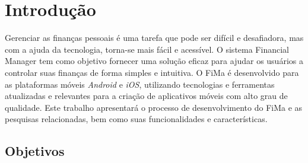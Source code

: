 % 

\chapter[Introdução]{Introdução}

Gerenciar as finanças pessoais é uma tarefa que pode ser difícil e desafiadora, mas com a ajuda da tecnologia, torna-se mais fácil e acessível. O sistema Financial Manager tem como objetivo fornecer uma solução eficaz para ajudar os usuários a controlar suas finanças de forma simples e intuitiva. O FiMa é desenvolvido para as plataformas móveis \textit{Android} e \textit{iOS}, utilizando tecnologias e ferramentas atualizadas e relevantes para a criação de aplicativos móveis com alto grau de qualidade. Este trabalho apresentará o processo de desenvolvimento do FiMa e as pesquisas relacionadas, bem como suas funcionalidades e características.

\section{Objetivos}

